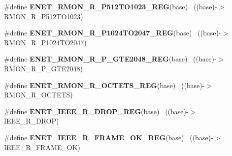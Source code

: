 \begin{DoxyCompactItemize}
\item 
\hypertarget{group___e_n_e_t___register___accessor___macros_ga61f4b1b1de08020503498e9c61a34730}{}\#define {\bfseries E\+N\+E\+T\+\_\+\+R\+M\+O\+N\+\_\+\+R\+\_\+\+P512\+T\+O1023\+\_\+\+R\+E\+G}(base)              ~((base)-\/$>$R\+M\+O\+N\+\_\+\+R\+\_\+\+P512\+T\+O1023)\label{group___e_n_e_t___register___accessor___macros_ga61f4b1b1de08020503498e9c61a34730}

\item 
\hypertarget{group___e_n_e_t___register___accessor___macros_ga4af7e039a82d4042a312c8772e9ec944}{}\#define {\bfseries E\+N\+E\+T\+\_\+\+R\+M\+O\+N\+\_\+\+R\+\_\+\+P1024\+T\+O2047\+\_\+\+R\+E\+G}(base)            ~((base)-\/$>$R\+M\+O\+N\+\_\+\+R\+\_\+\+P1024\+T\+O2047)\label{group___e_n_e_t___register___accessor___macros_ga4af7e039a82d4042a312c8772e9ec944}

\item 
\hypertarget{group___e_n_e_t___register___accessor___macros_gafa11ba9c0424f3d9ec19d2128bf0d3b2}{}\#define {\bfseries E\+N\+E\+T\+\_\+\+R\+M\+O\+N\+\_\+\+R\+\_\+\+P\+\_\+\+G\+T\+E2048\+\_\+\+R\+E\+G}(base)                ~((base)-\/$>$R\+M\+O\+N\+\_\+\+R\+\_\+\+P\+\_\+\+G\+T\+E2048)\label{group___e_n_e_t___register___accessor___macros_gafa11ba9c0424f3d9ec19d2128bf0d3b2}

\item 
\hypertarget{group___e_n_e_t___register___accessor___macros_ga903af87a4ad42499364033f4da7e1c28}{}\#define {\bfseries E\+N\+E\+T\+\_\+\+R\+M\+O\+N\+\_\+\+R\+\_\+\+O\+C\+T\+E\+T\+S\+\_\+\+R\+E\+G}(base)                      ~((base)-\/$>$R\+M\+O\+N\+\_\+\+R\+\_\+\+O\+C\+T\+E\+T\+S)\label{group___e_n_e_t___register___accessor___macros_ga903af87a4ad42499364033f4da7e1c28}

\item 
\hypertarget{group___e_n_e_t___register___accessor___macros_ga6beb798b74cd27dec925ac7ea0639528}{}\#define {\bfseries E\+N\+E\+T\+\_\+\+I\+E\+E\+E\+\_\+\+R\+\_\+\+D\+R\+O\+P\+\_\+\+R\+E\+G}(base)                          ~((base)-\/$>$I\+E\+E\+E\+\_\+\+R\+\_\+\+D\+R\+O\+P)\label{group___e_n_e_t___register___accessor___macros_ga6beb798b74cd27dec925ac7ea0639528}

\item 
\hypertarget{group___e_n_e_t___register___accessor___macros_gaaec3c8c8c034e466fd37dc14959f734a}{}\#define {\bfseries E\+N\+E\+T\+\_\+\+I\+E\+E\+E\+\_\+\+R\+\_\+\+F\+R\+A\+M\+E\+\_\+\+O\+K\+\_\+\+R\+E\+G}(base)                  ~((base)-\/$>$I\+E\+E\+E\+\_\+\+R\+\_\+\+F\+R\+A\+M\+E\+\_\+\+O\+K)\label{group___e_n_e_t___register___accessor___macros_gaaec3c8c8c034e466fd37dc14959f734a}


\end{DoxyCompactItemize}
